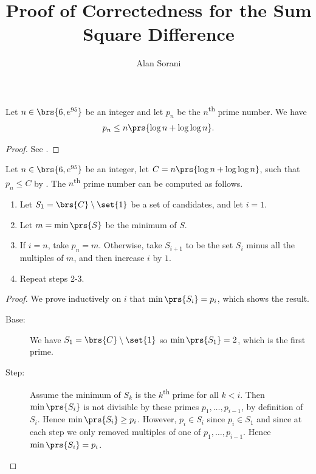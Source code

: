 \documentclass[10pt]{article}
\author{Alan Sorani}
\title{Proof of Correctedness for the Sum Square Difference}
\begin{document}
\maketitle

\begin{lemma} \label{lemma:prime-upper-bound}
Let $n \in \brs{6, e^{95}}$ be an integer and let $p_n$ be the $n$\textsuperscript{th} prime number.
We have
\begin{align*}
p_n \leq n \prs{\log n + \log \log n} \text{.}
\end{align*}
\end{lemma}

\begin{proof}
See \cite{prime-bounds-rosser}.
\end{proof}

\begin{theorem}
Let $n \in \brs{6, e^{95}}$ be an integer, let $C = n \prs{\log n + \log \log n}$, such that $p_n \leq C$ by . The $n$\textsuperscript{th} prime number can be computed as follows.

\begin{enumerate}
\item Let $S_1 = \brs{C} \setminus \set{1}$ be a set of candidates, and let $i = 1$.
\item Let $m = \min\prs{S}$ be the minimum of $S$.
\item If $i = n$, take $p_n = m$. Otherwise, take $S_{i+1}$ to be the set $S_i$ minus all the multiples of $m$, and then increase $i$ by $1$.
\item Repeat steps 2-3.
\end{enumerate}
\end{theorem}

\begin{proof}
We prove inductively on $i$ that $\min\prs{S_i} = p_i$, which shows the result.
\begin{description}
\item[Base:] We have $S_1 = \brs{C} \setminus \set{1}$ so $\min\prs{S_1} = 2$, which is the first prime.

\item[Step:] Assume the minimum of $S_k$ is the $k$\textsuperscript{th} prime for all $k < i$. Then $\min\prs{S_i}$ is not divisible by these primes $p_1, \ldots, p_{i-1}$, by definition of $S_i$. Hence $\min\prs{S_i} \geq p_i$. However, $p_i \in S_i$ since $p_i \in S_1$ and since at each step we only removed multiples of one of $p_1, \ldots, p_{i-1}$. Hence $\min\prs{S_i} = p_i$.
\end{description}
\end{proof}

\printbibliography
\end{document}
